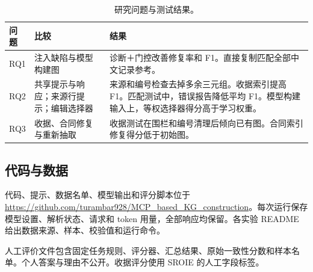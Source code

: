 \begin{table}[t]
\centering
\caption{研究问题与测试结果。}
\label{tab:research_answers}
\small
\begin{tabularx}{\textwidth}{@{}p{}XX@{}}
\toprule
问题 & 比较 & 结果 \\
\midrule
RQ1 & 注入缺陷与模型构建图
& 诊断＋门控改善修复率和 F1。直接复制匹配全部中文记录参考。 \\
RQ2 & 共享提示与响应；来源行提示；编辑选择器
& 来源和编号检查去掉多余三元组。收据索引提高 F1。匹配测试中，错误报告降低平均 F1。模型构建输入上，等权选择器得分高于学习权重。 \\
RQ3 & 收据、合同修复与重新抽取
& 收据测试在围栏和编号清理后倾向已有图。合同索引修复得分低于初始图。 \\
\bottomrule
\end{tabularx}
\end{table}

\subsection{代码与数据}
\label{sec:eval:artifacts}

代码、提示、数据名单、模型输出和评分脚本位于 \url{https://github.com/turambar928/MCP_based_KG_construction}。每次运行保存模型设置、解析状态、请求和 token 用量，全部响应均保留。各实验 README 给出数据来源、样本、校验值和运行命令。

人工评价文件包含固定任务规则、评分器、汇总结果、原始一致性分数和样本名单。个人答案与理由不公开。收据评分使用 SROIE 的人工字段标签。